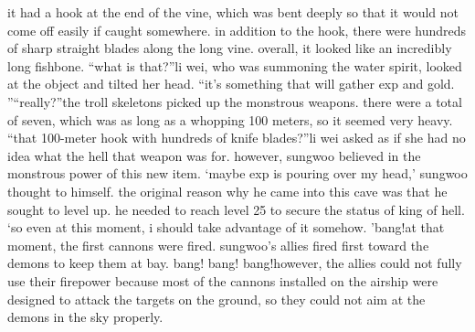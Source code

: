 it had a hook at the end of the vine, which was bent deeply so that it would not come off easily if caught somewhere.
 in addition to the hook, there were hundreds of sharp straight blades along the long vine.
 overall, it looked like an incredibly long fishbone.
“what is that?”li wei, who was summoning the water spirit, looked at the object and tilted her head.
“it’s something that will gather exp and gold.
”“really?”the troll skeletons picked up the monstrous weapons.
 there were a total of seven, which was as long as a whopping 100 meters, so it seemed very heavy.
“that 100-meter hook with hundreds of knife blades?”li wei asked as if she had no idea what the hell that weapon was for.
 however, sungwoo believed in the monstrous power of this new item.
‘maybe exp is pouring over my head,’ sungwoo thought to himself.
the original reason why he came into this cave was that he sought to level up.
he needed to reach level 25 to secure the status of king of hell.
‘so even at this moment, i should take advantage of it somehow.
’bang!at that moment, the first cannons were fired.
 sungwoo’s allies fired first toward the demons to keep them at bay.
bang! bang! bang!however, the allies could not fully use their firepower because most of the cannons installed on the airship were designed to attack the targets on the ground, so they could not aim at the demons in the sky properly.


 